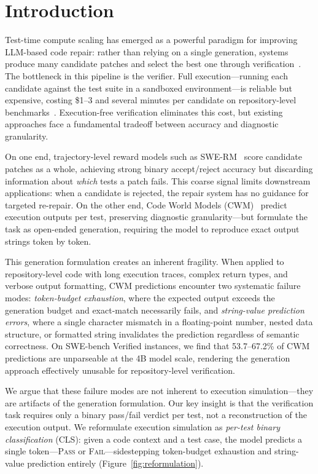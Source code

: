 
\section{Introduction}
\label{sec:introduction}

Test-time compute scaling has emerged as a powerful paradigm for improving LLM-based code repair: rather than relying on a single generation, systems produce many candidate patches and select the best one through verification~\citep{snell2024scaling}. The bottleneck in this pipeline is the verifier. Full execution---running each candidate against the test suite in a sandboxed environment---is reliable but expensive, costing \$1--3 and several minutes per candidate on repository-level benchmarks~\citep{jimenez2024swebench}. Execution-free verification eliminates this cost, but existing approaches face a fundamental tradeoff between accuracy and diagnostic granularity.

On one end, trajectory-level reward models such as SWE-RM~\citep{zhang2025swerm} score candidate patches as a whole, achieving strong binary accept/reject accuracy but discarding information about \emph{which} tests a patch fails. This coarse signal limits downstream applications: when a candidate is rejected, the repair system has no guidance for targeted re-repair. On the other end, Code World Models (CWM)~\citep{meta2025cwm,ding2025selfexecution} predict execution outputs per test, preserving diagnostic granularity---but formulate the task as open-ended generation, requiring the model to reproduce exact output strings token by token.

This generation formulation creates an inherent fragility. When applied to repository-level code with long execution traces, complex return types, and verbose output formatting, CWM predictions encounter two systematic failure modes: \emph{token-budget exhaustion}, where the expected output exceeds the generation budget and exact-match necessarily fails, and \emph{string-value prediction errors}, where a single character mismatch in a floating-point number, nested data structure, or formatted string invalidates the prediction regardless of semantic correctness. On SWE-bench Verified instances, we find that 53.7--67.2\% of CWM predictions are unparseable at the 4B model scale, rendering the generation approach effectively unusable for repository-level verification.

We argue that these failure modes are not inherent to execution simulation---they are artifacts of the generation formulation. Our key insight is that the verification task requires only a binary pass/fail verdict per test, not a reconstruction of the execution output. We reformulate execution simulation as \emph{per-test binary classification} (CLS): given a code context and a test case, the model predicts a single token---\textsc{Pass} or \textsc{Fail}---sidestepping token-budget exhaustion and string-value prediction entirely (Figure~\ref{fig:reformulation}).

